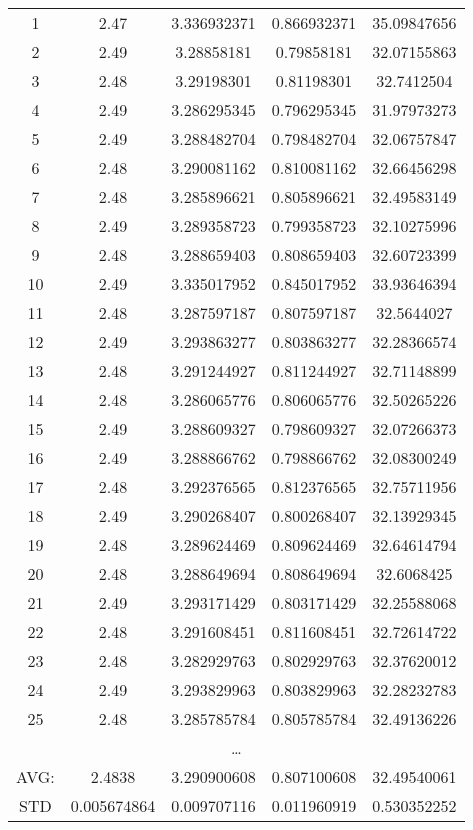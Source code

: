 \begin{center}
\begin{longtable}{c|c|c|c|c}
1	&	2.47	&	3.336932371	&	0.866932371	&	35.09847656	\\
2	&	2.49	&	3.28858181	&	0.79858181	&	32.07155863	\\
3	&	2.48	&	3.29198301	&	0.81198301	&	32.7412504	\\
4	&	2.49	&	3.286295345	&	0.796295345	&	31.97973273	\\
5	&	2.49	&	3.288482704	&	0.798482704	&	32.06757847	\\
6	&	2.48	&	3.290081162	&	0.810081162	&	32.66456298	\\
7	&	2.48	&	3.285896621	&	0.805896621	&	32.49583149	\\
8	&	2.49	&	3.289358723	&	0.799358723	&	32.10275996	\\
9	&	2.48	&	3.288659403	&	0.808659403	&	32.60723399	\\
10	&	2.49	&	3.335017952	&	0.845017952	&	33.93646394	\\
11	&	2.48	&	3.287597187	&	0.807597187	&	32.5644027	\\
12	&	2.49	&	3.293863277	&	0.803863277	&	32.28366574	\\
13	&	2.48	&	3.291244927	&	0.811244927	&	32.71148899	\\
14	&	2.48	&	3.286065776	&	0.806065776	&	32.50265226	\\
15	&	2.49	&	3.288609327	&	0.798609327	&	32.07266373	\\
16	&	2.49	&	3.288866762	&	0.798866762	&	32.08300249	\\
17	&	2.48	&	3.292376565	&	0.812376565	&	32.75711956	\\
18	&	2.49	&	3.290268407	&	0.800268407	&	32.13929345	\\
19	&	2.48	&	3.289624469	&	0.809624469	&	32.64614794	\\
20	&	2.48	&	3.288649694	&	0.808649694	&	32.6068425	\\
21	&	2.49	&	3.293171429	&	0.803171429	&	32.25588068	\\
22	&	2.48	&	3.291608451	&	0.811608451	&	32.72614722	\\
23	&	2.48	&	3.282929763	&	0.802929763	&	32.37620012	\\
24	&	2.49	&	3.293829963	&	0.803829963	&	32.28232783	\\
25	&	2.48	&	3.285785784	&	0.805785784	&	32.49136226	\\
\multicolumn{5}{c}{\ldots} \\
\bottomrule[2pt]
AVG:	&	2.4838	&	3.290900608	&	0.807100608	&	32.49540061	\\
STD	&	0.005674864	&	0.009707116	&	0.011960919	&	0.530352252	\\

\end{longtable}
\end{center}

